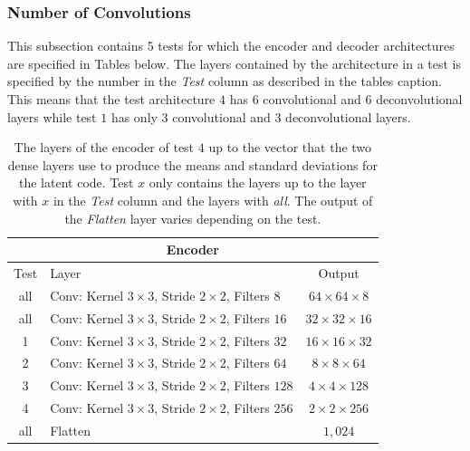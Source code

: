 \subsubsection{Number of Convolutions} \label{section_number_of_convolutions_experiment}

This subsection contains 5 tests for which the encoder and decoder architectures are specified in Tables below.
The layers contained by the architecture in a test is specified by the number in the \textit{Test} column as 
described in the tables caption. This means that the test architecture $4$ has $6$ convolutional and
$6$ deconvolutional layers while test $1$ has only $3$ convolutional and $3$ deconvolutional
layers.

\begin{center}
    \begin{table}[H] \label{table_encoder_num_conv}
        \centering
        \begin{tabular}{ | c | l | c | }
            \multicolumn{3}{c}{Encoder} \\ \hline
            Test &Layer & Output\\ \hline
            all &Conv: Kernel $3\times3$, Stride $2\times2$, Filters $8  $    & $64\times 64\times 8  $    \\  
            all &Conv: Kernel $3\times3$, Stride $2\times2$, Filters $16 $    & $32\times 32\times 16 $    \\
            1   &Conv: Kernel $3\times3$, Stride $2\times2$, Filters $32 $    & $16\times 16\times 32 $    \\
            2   &Conv: Kernel $3\times3$, Stride $2\times2$, Filters $64 $    & $8\times 8\times   64 $    \\
            3   &Conv: Kernel $3\times3$, Stride $2\times2$, Filters $128$    & $4\times 4\times   128$    \\
            4   &Conv: Kernel $3\times3$, Stride $2\times2$, Filters $256$    & $2\times 2\times   256$    \\
            all &Flatten                                                              & $1,024$                    \\
            \hline
        \end{tabular} 
        \caption{The layers of the encoder of test $4$ up to the vector that the two dense layers use to produce 
        the means and standard deviations for the latent code. Test $x$ only contains the layers up to
        the layer with $x$ in the \textit{Test} column and the layers with \textit{all}.
        The output of the \textit{Flatten} layer
        varies depending on the test.}
    \end{table}
\end{center}
